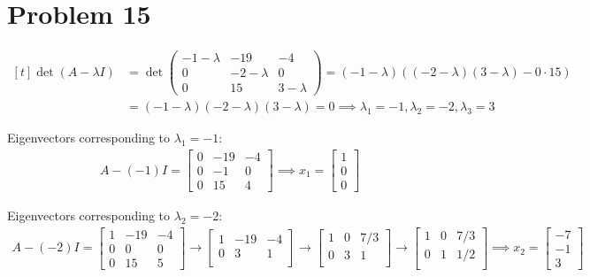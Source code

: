 \documentclass{article}
\newcommand*{\problem}[1]{\section*{Problem #1}}
\begin{document}
\pagebreak

\problem{15}
$\begin{aligned}[t]
    \det(A-\lambda I)
	&=\det \begin{pmatrix}
		-1-\lambda & -19 & -4 \\
		0 & -2-\lambda & 0 \\
		0 & 15 & 3-\lambda
	\end{pmatrix}
	=(-1-\lambda)((-2-\lambda)(3-\lambda)-0\cdot15) \\
	&=(-1-\lambda)(-2-\lambda)(3-\lambda)
	=0 \implies \lambda_1=-1,\lambda_2=-2,\lambda_3=3
\end{aligned}$

Eigenvectors corresponding to $\lambda_1=-1$:
\begin{align*}
    A-(-1)I
	=\begin{bmatrix}
		0 & -19 & -4 \\
		0 & -1 & 0 \\
		0 & 15 & 4
	\end{bmatrix}
	\implies x_1=\begin{bmatrix}
		1 \\ 0 \\ 0
	\end{bmatrix}
\end{align*}

Eigenvectors corresponding to $\lambda_2=-2$:
\begin{align*}
    A-(-2)I
	=\begin{bmatrix}
		1 & -19 & -4 \\
		0 & 0 & 0 \\
		0 & 15 & 5
	\end{bmatrix}
	\rightarrow \begin{bmatrix}
		1 & -19 & -4 \\
		0 & 3 & 1 \\
	\end{bmatrix}
	\rightarrow \begin{bmatrix}
		1 & 0 & 7/3 \\
		0 & 3 & 1 \\
	\end{bmatrix}
	\rightarrow \begin{bmatrix}
		1 & 0 & 7/3 \\
		0 & 1 & 1/2 \\
	\end{bmatrix}
	\implies x_2 = \begin{bmatrix}
	    -7 \\ -1 \\ 3
	\end{bmatrix}
\end{align*}
\end{document}
